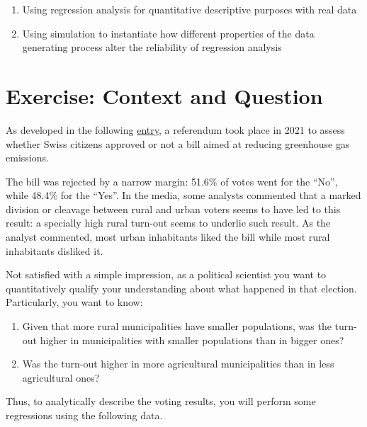 \documentclass[
]{book}
\providecommand{\tightlist}{%
  \setlength{\itemsep}{0pt}\setlength{\parskip}{0pt}}
\begin{document}
\begin{enumerate}
\def\labelenumi{\arabic{enumi}.}
\tightlist
\item
  Using regression analysis for quantitative descriptive purposes with real data
\item
  Using simulation to instantiate how different properties of the data generating process alter the reliability of regression analysis
\end{enumerate}

\hypertarget{exercise-context-and-question}{%
\section{Exercise: Context and Question}\label{exercise-context-and-question}}

As developed in the following \href{https://de.wikipedia.org/wiki/Eidgen\%C3\%B6ssische_Abstimmung_\%C3\%BCber_die_Totalrevision_des_CO2-Gesetzes\#:~:text=Die\%20Eidgen\%C3\%B6ssische\%20Abstimmung\%20\%C3\%BCber\%20die,von\%2051\%2C59\%20\%25\%20abgelehnt.}{entry}, a referendum took place in 2021 to assess whether Swiss citizens approved or not a bill aimed at reducing greenhouse gas emissions.

The bill was rejected by a narrow margin: 51.6\% of votes went for the ``No'', while 48.4\% for the ``Yes''. In the media, some analysts commented that a marked division or cleavage between rural and urban voters seems to have led to this result: a specially high rural turn-out seems to underlie such result. As the analyst commented, most urban inhabitants liked the bill while most rural inhabitants disliked it.

Not satisfied with a simple impression, as a political scientist you want to quantitatively qualify your understanding about what happened in that election. Particularly, you want to know:

\begin{enumerate}
\def\labelenumi{\arabic{enumi}.}
\tightlist
\item
  Given that more rural municipalities have smaller populations, was the turn-out higher in municipalities with smaller populations than in bigger ones?
\item
  Was the turn-out higher in more agricultural municipalities than in less agricultural ones?
\end{enumerate}

Thus, to analytically describe the voting results, you will perform some regressions using the following data.
\end{document}
